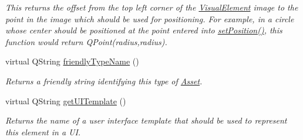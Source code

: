 \begin{DoxyCompactItemize}
\begin{DoxyCompactList}\small\item\em This returns the offset from the top left corner of the \hyperlink{struct_picto_1_1_visual_element}{Visual\-Element} image to the point in the image which should be used for positioning. For example, in a circle whose center should be positioned at the point entered into \hyperlink{struct_picto_1_1_visual_element_a454cc96862097e96a0b0f1d2c83e23ed}{set\-Position()}, this function would return Q\-Point(radius,radius). \end{DoxyCompactList}\item 
virtual Q\-String \hyperlink{class_picto_1_1_randomly_filled_grid_graphic_aed954b5c044b267c4da5a7869f55c9c5}{friendly\-Type\-Name} ()
\begin{DoxyCompactList}\small\item\em Returns a friendly string identifying this type of \hyperlink{class_picto_1_1_asset}{Asset}. \end{DoxyCompactList}\item 
\hypertarget{class_picto_1_1_randomly_filled_grid_graphic_a02db53d5e936e69ef1c49f11e9ed8af9}{virtual Q\-String \hyperlink{class_picto_1_1_randomly_filled_grid_graphic_a02db53d5e936e69ef1c49f11e9ed8af9}{get\-U\-I\-Template} ()}\label{class_picto_1_1_randomly_filled_grid_graphic_a02db53d5e936e69ef1c49f11e9ed8af9}

\begin{DoxyCompactList}\small\item\em Returns the name of a user interface template that should be used to represent this element in a U\-I. \end{DoxyCompactList}\end{DoxyCompactItemize}
